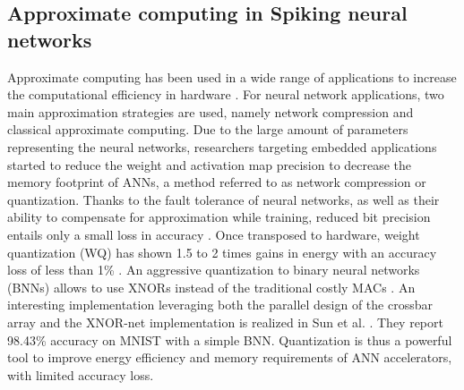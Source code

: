 \subsection{Approximate computing in Spiking neural networks}
Approximate computing has been used in a wide range of applications to increase the computational efficiency in hardware \cite{han2013approximate}. For neural network applications, two main approximation strategies are used, namely network compression and classical approximate computing.
Due to the large amount of parameters representing the neural networks, researchers targeting embedded applications started to reduce the weight and activation map precision to decrease the memory footprint of ANNs, a method referred to as network compression or quantization.
Thanks to the fault tolerance of neural networks, as well as their ability to compensate for approximation while training, reduced bit precision entails only a small loss in accuracy \cite{courbariaux2015binaryconnect, han2015deep, hubara2017quantized, rastegari2016xnor}.
Once transposed to hardware, weight quantization (WQ) has shown 1.5 to 2 times gains in energy
with an accuracy loss of less than 1\% \cite{moons20160, whatmough201714}. An aggressive quantization to binary neural networks (BNNs) allows to use XNORs instead of the traditional costly MACs \cite{rastegari2016xnor}. An interesting implementation leveraging both the parallel design of the crossbar array and the XNOR-net implementation is realized in Sun et al. \cite{sun2018xnor}. They report 98.43\% accuracy on MNIST with a simple BNN. Quantization is thus a powerful tool to improve energy efficiency and memory requirements of ANN accelerators, with limited accuracy loss.

